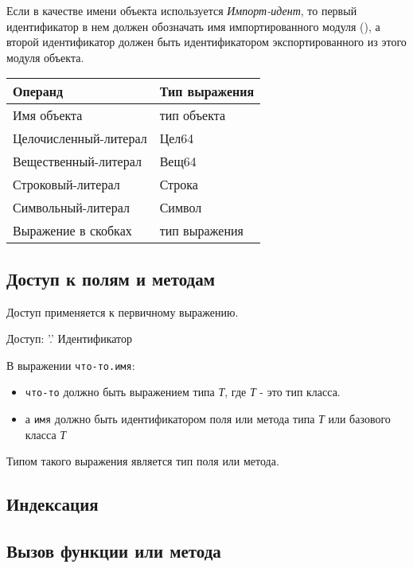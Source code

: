 Если в качестве имени объекта используется \emph{Импорт-идент}, то первый идентификатор в нем должен обозначать имя импортированного модуля (), а второй идентификатор должен быть идентификатором экспортированного из этого модуля объекта.

\smallskip
\begin{tabular}[c]{l|l}
\textbf{Операнд} & \textbf{Тип выражения} \\ \hline
Имя объекта & тип объекта \\
Целочисленный-литерал & Цел64 \\
Вещественный-литерал & Вещ64 \\ 
Строковый-литерал & Строка \\ 
Символьный-литерал & Символ \\
Выражение в скобках & тип выражения \\
\end{tabular}

\hypertarget{selector}{%
\subsection{Доступ к полям и методам}\label{expr:selector}}

Доступ применяется к первичному выражению.

\begin{Grammar}
Доступ: '.' Идентификатор
\end{Grammar}    

В выражении \verb|что-то.имя|:
\begin{itemize}
\item
    \verb|что-то| должно быть выражением типа \emph{Т}, где \emph{Т} - это тип класса. 
\item
    а \verb|имя| должно быть идентификатором поля или метода типа \emph{Т} или базового класса \emph{Т}
\end{itemize}

Типом такого выражения является тип поля или метода.

\hypertarget{indexation}{%
\subsection{Индексация}\label{expr:indexation}}


\hypertarget{call}{%
\subsection{Вызов функции или метода}\label{expr:call}}

